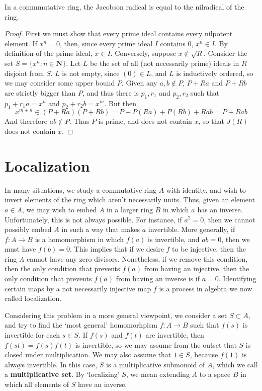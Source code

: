 \begin{theorem}
    In a commmutative ring, the Jacobson radical is equal to the nilradical of the ring.
\end{theorem}
\begin{proof}
    First we must show that every prime ideal contains every nilpotent element. If $x^n = 0$, then, since every prime ideal $I$ contains $0$, $x^n \in I$. By definition of the prime ideal, $x \in I$. Conversely, suppose $x \not\in \sqrt{R}$. Consider the set $S = \{ x^n : n \in \mathbf{N} \}$. Let $L$ be the set of all (not necessarily prime) ideals in $R$ disjoint from $S$. $L$ is not empty, since $(0) \in L$, and $L$ is inductively ordered, so we may consider some upper bound $P$. Given any $a,b \not\in P$, $P + Ra$ and $P + Rb$ are strictly bigger than $P$, and thus there is $p_1,r_1$ and $p_2,r_2$ such that $p_1 + r_1a = x^n$ and $p_2 + r_2b = x^m$. But then
    \[ x^{m + n} \in (P + Ra)(P + Rb) = P + P(Ra) + P(Rb) + Rab = P + Rab \]
    And therefore $ab \notin P$. Thus $P$ is prime, and does not contain $x$, so that $J(R)$ does not contain $x$.
\end{proof}

\section{Localization}

In many situations, we study a commutative ring $A$ with identity, and wish to invert elements of the ring which aren't necessarily units. Thus, given an element $a \in A$, we may wish to embed $A$ in a larger ring $B$ in which $a$ has an inverse. Unfortunately, this is not always possible. For instance, if $a^2 = 0$, then we cannot possibly embed $A$ in such a way that makes $a$ invertible. More generally, if $f:A \to B$ is a homomorphism in which $f(a)$ is invertible, and $ab = 0$, then we must have $f(b) = 0$. This implies that if we desire $f$ to be injective, then the ring $A$ cannot have any zero divisors. Nonetheless, if we remove this condition, then the only condition that prevents $f(a)$ from having an injective, then the only condition that prevents $f(a)$ from having an inverse is if $a = 0$. Identifying certain maps by a not necessarily injective map $f$ is a process in algebra we now called localization.

Considering this problem in a more general viewpoint, we consider a set $S \subset A$, and try to find the `most general' homomorhpism $f: A \to B$ such that $f(s)$ is invertible for each $s \in S$. If $f(s)$ and $f(t)$ are invertible, then $f(st) = f(s)f(t)$ is invertible, so we may assume from the outset that $S$ is closed under multiplication. We may also assume that $1 \in S$, because $f(1)$ is always invertible. In this case, $S$ is a multiplicative submonoid of $A$, which we call a {\bf multiplicative set}. By `localizing' $S$, we mean extending $A$ to a space $B$ in which all elements of $S$ have an inverse.

